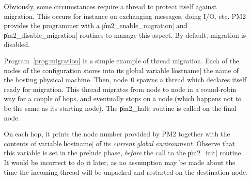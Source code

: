 Obviously, some circumstances require a thread to protect itself
against migration. This occurs for instance on exchanging messages,
doing I/O, etc. PM2 provides the programmer with a
\|pm2_enable_migration| and \|pm2_disable_migration| routines to
manage this aspect. By default, migration is disabled.

Program~\ref{prog:migration} is a simple example of thread migration.
Each of the nodes of the configuration stores into its global variable
\|hostname| the name of the hosting physical machine. Then, node~0
spawns a thread which declares itself ready for migration. This thread
migrates from node to node in a round-robin way for a couple of hops,
and eventually stops on a node (which happens not to be the same as
its starting node). The \|pm2_halt| routine is called on the final
node. 

On each hop, it prints the node number provided by PM2 together with
the contents of variable \|hostname| of its \emph{current global
  environment}. Observe that this variable is set in the prelude
phase, \emph{before} the call to the \|pm2_init| routine. It would be
incorrect to do it later, as no assumption may be made about the time
the incoming thread will be unpacked and restarted on the destination
node.

